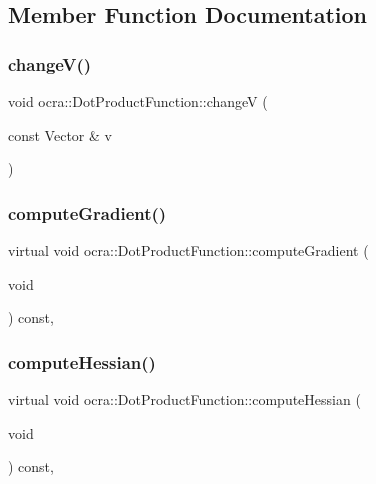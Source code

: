 \subsection{Member Function Documentation}
\hypertarget{classocra_1_1DotProductFunction_a2c7c65e80d7fb5ac1da43421a792f77b}{}\label{classocra_1_1DotProductFunction_a2c7c65e80d7fb5ac1da43421a792f77b} 
\subsubsection{\texorpdfstring{change\+V()}{changeV()}}
{\footnotesize\ttfamily void ocra\+::\+Dot\+Product\+Function\+::changeV (\begin{DoxyParamCaption}\item[{const Vector \&}]{v }\end{DoxyParamCaption})}

\hypertarget{classocra_1_1DotProductFunction_af088997b35bf792a1f1c9c6fb78c0fe1}{}\label{classocra_1_1DotProductFunction_af088997b35bf792a1f1c9c6fb78c0fe1} 
\subsubsection{\texorpdfstring{compute\+Gradient()}{computeGradient()}}
{\footnotesize\ttfamily virtual void ocra\+::\+Dot\+Product\+Function\+::compute\+Gradient (\begin{DoxyParamCaption}\item[{void}]{ }\end{DoxyParamCaption}) const\hspace{0.3cm}{\ttfamily [protected]}, {\ttfamily [virtual]}}

\hypertarget{classocra_1_1DotProductFunction_a97dcdd721c76f80cb20e257aca4f8a58}{}\label{classocra_1_1DotProductFunction_a97dcdd721c76f80cb20e257aca4f8a58} 
\subsubsection{\texorpdfstring{compute\+Hessian()}{computeHessian()}}
{\footnotesize\ttfamily virtual void ocra\+::\+Dot\+Product\+Function\+::compute\+Hessian (\begin{DoxyParamCaption}\item[{void}]{ }\end{DoxyParamCaption}) const\hspace{0.3cm}{\ttfamily [protected]}, {\ttfamily [virtual]}}

